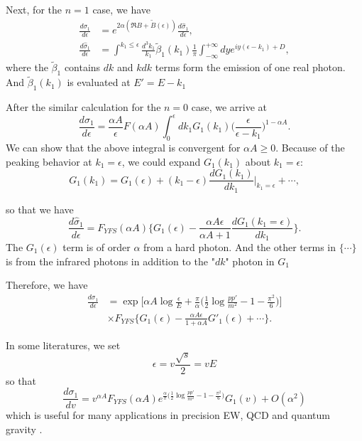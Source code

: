 Next, for the $n = 1$ case, we have
\begin{align}
\frac{d\sigma_1}{d\epsilon} &= e^{2\alpha(\Re B + \tilde{B}(\epsilon))} \frac{d\hat{\sigma}_1}{d\epsilon},\nonumber\\
\frac{d\hat{\sigma}_1}{d\epsilon} &= \int^{k_1 \le \epsilon} \frac{d^3 k_1}{k_1}\tilde{\beta}_1(k_1)\frac{1}{\pi}\int_{-\infty}^{+\infty}dy e^{iy(\epsilon - k_1)+D},
\end{align}
where the $\tilde{\beta}_1$ contains $dk$ and $kdk$ terms form the emission of one real photon. And $\tilde{\beta}_1(k_1)$ is evaluated at $E' = E - k_1$

After the similar calculation for the $n = 0$ case, we arrive at 
\begin{equation}
\frac{d\sigma_1}{d\epsilon} = \frac{\alpha A}{\epsilon} F(\alpha A) \int_{0}^{\epsilon} dk_1 G_1(k_1)\Big(\frac{\epsilon}{\epsilon - k_1}\Big)^{1 - \alpha A}.
\end{equation}
We can show that the above integral is convergent for $\alpha A \ge 0$. Because of the peaking behavior at $k_1 = \epsilon$, we could expand $G_1(k_1)$ about $k_1 = \epsilon$:
\begin{equation}
G_1(k_1) = G_1(\epsilon) + (k_1 - \epsilon)\frac{dG_1(k_1)}{dk_1}\biggr|_{k_1 = \epsilon} + \cdots,
\end{equation}

so that we have 
\begin{equation}
\frac{d\hat{\sigma}_1}{d\epsilon} = F_{YFS}(\alpha A) \Biggl\{G_1(\epsilon) - \frac{\alpha A \epsilon}{\alpha A +1}\frac{dG_1(k_1=\epsilon)}{dk_1}\Biggr\}.
\end{equation}
The $G_1(\epsilon)$ term is of order $\alpha$ from a hard photon. And the other terms in $\{\cdots\}$ is from the infrared photons in addition to the "$dk$" photon in $G_1$

Therefore, we have \cite{BFLWQFT}
\begin{align}
\frac{d\sigma_1}{d\epsilon}&=\exp \biggl[\alpha A \log\frac{\epsilon}{E} + \frac{\pi}{\alpha}\Big(\frac{1}{2}\log\frac{pp'}{m^2} - 1 - \frac{\pi^2}{6}\Big)\biggr]\nonumber\\
& \times F_{YFS}\Biggl\{ G_1(\epsilon) -\frac{\alpha A \epsilon}{1 + \alpha A}G'_1(\epsilon)+\cdots\Biggr\}.
\end{align}

In some literatures, we set 
\begin{equation}
\epsilon = v \frac{\sqrt{s}}{2} = vE
\end{equation}
so that
\begin{equation}
\frac{d\sigma_1}{dv} = v^{\alpha A} F_{YFS}(\alpha A) e^{\frac{\alpha}{\pi}\big(\frac{1}{2}\log\frac{pp'}{m^2}-1-\frac{\pi^2}{6}\big)} G_1(v) + O(\alpha^2)
\end{equation}
which is useful for many applications in precision EW, QCD and quantum gravity \cite{BFLWEWQCDQG}.